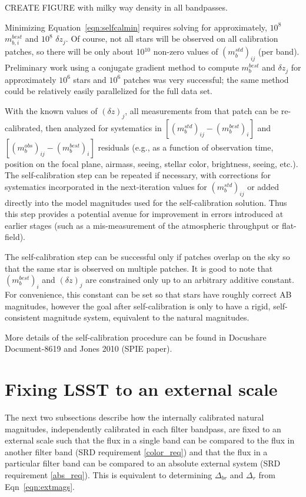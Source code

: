 \documentclass[12pt,preprint]{aastex}
\begin{document}
CREATE FIGURE with milky way density in all bandpasses.

Minimizing Equation~\ref{eqn:selfcalmin} requires solving for
approximately, $10^8$ $m_{b,i}^{best}$ and $10^8$ $\delta z_j$. Of
course, not all stars will be observed on all calibration patches, so
there will be only about 10$^{10}$ non-zero values of
$(m_b^{std})_{ij}$ (per band). Preliminary work using a conjugate
gradient method to compute $m_{b}^{best}$ and $\delta z_j$ for
approximately $10^6$ stars and $10^6$ patches was very successful; the
same method could be relatively easily parallelized for the full data
set. 

With the known values of $(\delta z)_j$, all measurements from that
patch can be re-calibrated, then analyzed for systematics in
$[(m_b^{std})_{ij} - (m_b^{best})_{i}]$ and $[(m_b^{obs})_{ij} -
(m_b^{best})_{i}]$ residuals (e.g., as a function of observation time,
position on the focal plane, airmass, seeing, stellar color,
brightness, seeing, etc.). The self-calibration step can be repeated
if necessary, with corrections for systematics incorporated in the
next-iteration values for $(m_b^{std})_{ij}$ or added directly into
the model magnitudes used for the self-calibration solution. Thus this
step provides a potential avenue for improvement in errors introduced
at earlier stages (such as a mis-measurement of the atmospheric
throughput or flat-field). 

The self-calibration step can be successful only if patches
overlap on the sky so that the same star is observed on 
multiple patches. It is good to note that $(m_b^{best})_{i}$ and 
$(\delta z)_j$ are constrained only up to an arbitrary 
additive constant. For convenience, this constant can be set so that
stars have roughly correct AB magnitudes, however the goal after
self-calibration is only to have a rigid, self-consistent magnitude
system, equivalent to the natural magnitudes.

More details of the self-calibration procedure can be found in
Docushare Document-8619 and Jones 2010 (SPIE paper). 


\section{Fixing LSST to an external scale}
\label{sec:calib_external}

The next two subsections describe how the internally calibrated
natural magnitudes, independently calibrated in each filter bandpass, are fixed
to an external scale such that the flux in a single band can be compared to the
flux in another filter band (SRD requirement \ref{color_req}) and that
the flux in a particular filter band can be compared to an absolute
external system (SRD requirement \ref{abs_req}). This is equivalent to
determining $\Delta_{br}$ and $\Delta_r$ from Eqn~\ref{eqn:extmags}. 
\end{document}
